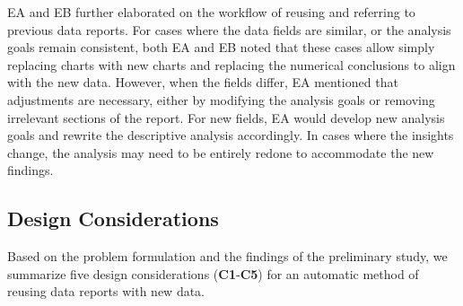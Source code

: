 EA and EB further elaborated on the workflow of reusing and referring to previous data reports. 
For cases where the data fields are similar, or the analysis goals remain consistent, both EA and EB noted that these cases allow simply replacing charts with new charts and replacing the numerical conclusions to align with the new data. 
However, when the fields differ, EA mentioned that adjustments are necessary, either by modifying the analysis goals or removing irrelevant sections of the report. 
For new fields, EA would develop new analysis goals and rewrite the descriptive analysis accordingly. In cases where the insights change, the analysis may need to be entirely redone to accommodate the new findings.

\subsection{Design Considerations}

Based on the problem formulation and the findings of the preliminary study, we summarize five design considerations (\textbf{C1}-\textbf{C5}) for an automatic method of reusing data reports with new data. 

